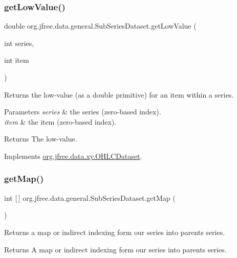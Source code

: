 \subsubsection{\texorpdfstring{get\+Low\+Value()}{getLowValue()}}
{\footnotesize\ttfamily double org.\+jfree.\+data.\+general.\+Sub\+Series\+Dataset.\+get\+Low\+Value (\begin{DoxyParamCaption}\item[{int}]{series,  }\item[{int}]{item }\end{DoxyParamCaption})}

Returns the low-\/value (as a double primitive) for an item within a series.


\begin{DoxyParams}{Parameters}
{\em series} & the series (zero-\/based index). \\
\hline
{\em item} & the item (zero-\/based index).\\
\hline
\end{DoxyParams}
\begin{DoxyReturn}{Returns}
The low-\/value. 
\end{DoxyReturn}


Implements \mbox{\hyperlink{interfaceorg_1_1jfree_1_1data_1_1xy_1_1_o_h_l_c_dataset_a19a2a153a113ed4f82eedd596e94d1ed}{org.\+jfree.\+data.\+xy.\+O\+H\+L\+C\+Dataset}}.

\mbox{\label{classorg_1_1jfree_1_1data_1_1general_1_1_sub_series_dataset_a20540010e04859741397e673b45e2efb}} 
\subsubsection{\texorpdfstring{get\+Map()}{getMap()}}
{\footnotesize\ttfamily int \mbox{[}$\,$\mbox{]} org.\+jfree.\+data.\+general.\+Sub\+Series\+Dataset.\+get\+Map (\begin{DoxyParamCaption}{ }\end{DoxyParamCaption})}

Returns a map or indirect indexing form our series into parent\textquotesingle{}s series.

\begin{DoxyReturn}{Returns}
A map or indirect indexing form our series into parent\textquotesingle{}s series. 
\end{DoxyReturn}


